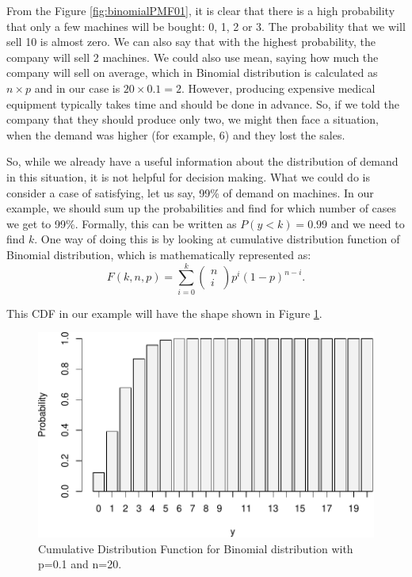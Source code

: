 \documentclass[
]{book}
\theoremstyle{definition}
\theoremstyle{definition}
\theoremstyle{definition}
\theoremstyle{definition}
\theoremstyle{remark}
\begin{document}
From the Figure \ref{fig:binomialPMF01}, it is clear that there is a high probability that only a few machines will be bought: 0, 1, 2 or 3. The probability that we will sell 10 is almost zero. We can also say that with the highest probability, the company will sell 2 machines. We could also use mean, saying how much the company will sell on average, which in Binomial distribution is calculated as \(n \times p\) and in our case is \(20 \times 0.1 = 2\). However, producing expensive medical equipment typically takes time and should be done in advance. So, if we told the company that they should produce only two, we might then face a situation, when the demand was higher (for example, 6) and they lost the sales.

So, while we already have a useful information about the distribution of demand in this situation, it is not helpful for decision making. What we could do is consider a case of satisfying, let us say, 99\% of demand on machines. In our example, we should sum up the probabilities and find for which number of cases we get to 99\%. Formally, this can be written as \(P(y<k)=0.99\) and we need to find \(k\). One way of doing this is by looking at cumulative distribution function of Binomial distribution, which is mathematically represented as:
\begin{equation}
    F(k, n, p) = \sum_{i=0}^k \begin{pmatrix} n \\ i \end{pmatrix} p^i (1-p)^{n-i} .
    \label{eq:BinomialCDF}
\end{equation}

This CDF in our example will have the shape shown in Figure \ref{fig:binomialCDF01}.

\begin{figure}
\centering
\includegraphics{Svetunkov---Statistics-for-Business-Analytics_files/figure-latex/binomialCDF01-1.pdf}
\caption{\label{fig:binomialCDF01}Cumulative Distribution Function for Binomial distribution with p=0.1 and n=20.}
\end{figure}
\end{document}
